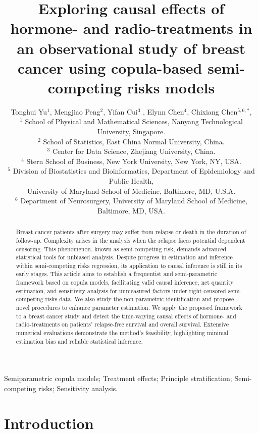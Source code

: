\documentclass[useAMS,usenatbib,referee]{biom}
\title[Copula-based causal models for semi-competing risks data]{Exploring causal effects of hormone- and radio-treatments in an observational study of breast cancer using copula-based semi-competing risks models}
\author{Tonghui Yu$^1$, Mengjiao Peng$^2$, Yifan Cui$^3$ , Elynn Chen$^{4}$, Chixiang Chen$^{5,6,*}$\email{chixiang.chen@som.umaryland.edu}, 
\hspace{.2cm} \\ 
$^1$ School of Physical and Mathematical Sciences, Nanyang Technological University, Singapore.\\
$^2$ School of Statistics, East China Normal University, China.\\
$^3$ Center for Data Science, Zhejiang University, China.\\
$^4$ Stern School of Business, New York University, New York, NY, USA.\\
$^5$ Division of Biostatistics and Bioinformatics, Department of Epidemiology and Public Health,\\ University of Maryland School of Medicine, Baltimore, MD, U.S.A.\\
$^6$ Department of Neurosurgery, University of Maryland School of Medicine, Baltimore, MD, USA.
}
\theoremstyle{plain}
\begin{document}
\pagerange{\pageref{firstpage}--\pageref{lastpage}} 

\label{firstpage}

\begin{abstract}
Breast cancer patients after surgery may suffer from relapse or death in the duration of follow-up. Complexity arises in the analysis when the relapse faces potential dependent censoring. This phenomenon, known as semi-competing risk, demands advanced statistical tools for unbiased analysis. Despite progress in estimation and inference within semi-competing risks regression, its application to causal inference is still in its early stages. This article aims to establish a frequentist and semi-parametric framework based on copula models, facilitating valid causal inference, net quantity estimation, and sensitivity analysis for unmeasured factors under right-censored semi-competing risks data. We also study the non-parametric identification and propose novel procedures to enhance parameter estimation. We apply the proposed framework to a breast cancer study and detect the time-varying causal effects of hormone- and radio-treatments on patients' relapse-free survival and overall survival. Extensive numerical evaluations demonstrate the method's feasibility, highlighting minimal estimation bias and reliable statistical inference. %


\end{abstract}


\begin{keywords}
Semiparametric copula models; Treatment effects; Principle stratification; Semi-competing risks;  Sensitivity analysis.
\end{keywords}

\maketitle

\section{Introduction}
\end{document}
